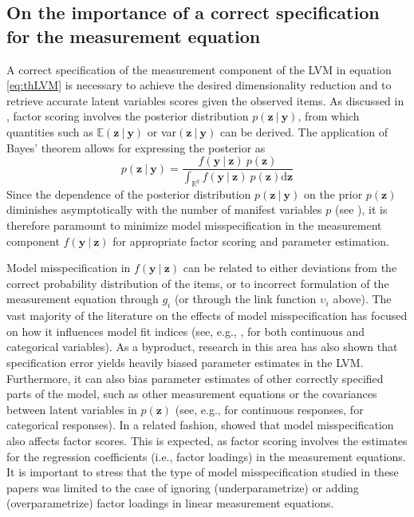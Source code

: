 \documentclass[11pt, a4paper]{article}
\newcommand{\R}{{\ensuremath{\mathbb{R}}}}
\newcommand{\cond}{\!~|~\!}
\begin{document}
\subsection{On the importance of a correct specification for the measurement equation}

A correct specification of the measurement component of the LVM in equation \eqref{eq:thLVM} is necessary to achieve the desired dimensionality reduction and to retrieve accurate latent variables scores given the observed items. As discussed in \citet[p. 41]{BKM2011}, factor scoring involves the posterior distribution $p(\mathbf{z}\cond\mathbf{y})$, from which quantities such as $\mathbb{E(\mathbf{z}\cond\mathbf{y})}$ or var$(\mathbf{z}\cond\mathbf{y})$ can be derived. The application of Bayes' theorem allows for expressing the posterior as 
\begin{equation}
p(\mathbf{z}\cond\mathbf{y}) = \frac{f(\mathbf{y}\cond\mathbf{z}) ~ p(\mathbf{z})}{\int_{\R^q} f(\mathbf{y}\cond\mathbf{z})~ p(\mathbf{z}) \text{d}\mathbf{z}} \label{eq:scoring}
\end{equation}
Since the dependence of the posterior distribution $p(\mathbf{z}\cond\mathbf{y})$ on the prior $p(\mathbf{z})$ diminishes asymptotically with the number of manifest variables $p$ (see \citealp{Holland_Psychometrika1990, Chang&Stout_Psychometrika1993, Knott&Albanese_BJPS1993}), it is therefore paramount to minimize model misspecification in the measurement component $f(\mathbf{y}\cond\mathbf{z})$ for appropriate factor scoring and parameter estimation.

Model misspecification in $f(\mathbf{y}\cond\mathbf{z})$ can be related to either deviations from the correct probability distribution of the items, or to incorrect formulation of the measurement equation through $g_i$ (or through the link function $\upsilon_i$ above). The vast majority of the literature on the effects of model misspecification has focused on how it influences model fit indices (see, e.g., \citealp{CurranEtAl_PsyMeth1996, Hu&Bentler_PsyMeth1998, Hu&Bentler_SEM1999, Fan&Wang_EPM1998, FanEtAl_SEM1999, Flora&Curran_PsyMeth2004, Fan&Sivo_SEM2005, Fan&Sivo_MultBehRes2007}, for both continuous and categorical variables). As a byproduct, research in this area has also shown that specification error yields heavily biased parameter estimates in the LVM. Furthermore, it can also bias parameter estimates of other correctly specified parts of the model, such as other measurement equations or the covariances between latent variables in $p(\mathbf{z})$ (see, e.g., \citealp{MacCallumEtAl_MultBehRes2001, BollenEtAl_SMR2007} for continuous responses, \citealp{YangWallentinEtAl_SEM2010} for categorical responses). In a related fashion, \citet{HardtEtAl_SEM2020} showed that model misspecification also affects factor scores. This is expected, as factor scoring involves the estimates for the regression coefficients (i.e., factor loadings) in the measurement equations. It is important to stress that the type of model misspecification studied in these papers was limited to the case of ignoring (underparametrize) or adding (overparametrize) factor loadings in linear measurement equations.
\end{document}
